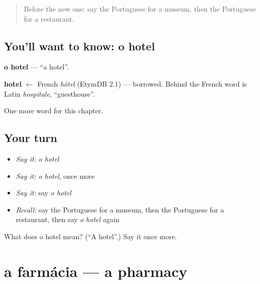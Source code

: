 \label{lesson:PT-C75-hotel}



\begin{quote}
Before the new one: say the Portuguese for a museum, then the Portuguese for a restaurant.
\end{quote}

\subsection*{You'll want to know: o hotel}
\textbf{o hotel} — \textquotedblleft{}a hotel\textquotedblright{}.

\begin{cousinweb}
\textbf{hotel} $\leftarrow$ French \emph{hôtel} (EtymDB 2.1) — borrowed. Behind the French word is Latin \emph{hospitale}, \textquotedblleft{}guesthouse\textquotedblright{}.
\end{cousinweb}

\begin{grammarlens}[title={What you've built}]
One more word for this chapter.
\end{grammarlens}

\subsection*{Your turn}
\begin{itemize}
\raggedright
  \item \emph{Say it:} \emph{o hotel}
  \item \emph{Say it:} \emph{o hotel}, once more
  \item \emph{Say it:} say \emph{o hotel}
  \item \emph{Recall:} say the Portuguese for a museum, then the Portuguese for a restaurant, then say \emph{o hotel} again
\end{itemize}

\begin{tcolorbox}[breakable,colback=teal!4,colframe=teal!35!black,title={Before you move on}]
What does o hotel mean? (\textquotedblleft{}A hotel\textquotedblright{}.) Say it once more.
\end{tcolorbox}
\section[a farmácia]{a farmácia — a pharmacy}

\label{lesson:PT-C75-farmacia}



